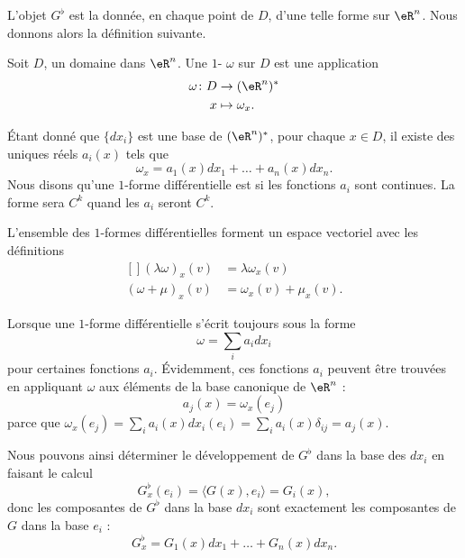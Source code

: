 L'objet $G^{\flat}$ est la donnée, en chaque point de $D$, d'une telle forme sur $\eR^n$. Nous donnons alors la définition suivante.
\begin{definition}
	Soit $D$, un domaine dans $\eR^n$. Une $1$- $\omega$ sur $D$ est une application
	\begin{equation}
		\begin{aligned}
				\omega\colon D&\to (\eR^n)^* \\
				x&\mapsto \omega_x. 
			\end{aligned}
		\end{equation}
\end{definition}
Étant donné que $\{ dx_i \}$ est une base de $(\eR^n)^*$, pour chaque $x\in D$, il existe des uniques réels $a_i(x)$ tels que
\begin{equation}
	\omega_x=a_1(x)dx_1+\ldots+a_n(x)dx_n.
\end{equation}
Nous disons qu'une $1$-forme différentielle est  si les fonctions $a_i$ sont continues. La forme sera $C^k$ quand les $a_i$ seront $C^k$.

\begin{remark}
	L'ensemble des $1$-formes différentielles forment un espace vectoriel avec les définitions
	\begin{equation}
		\begin{aligned}[]
			(\lambda\omega)_x(v)&=\lambda\omega_x(v)\\
			(\omega+\mu)_x(v)&=\omega_x(v)+\mu_x(v).
		\end{aligned}
	\end{equation}
\end{remark}

Lorsque une $1$-forme différentielle s'écrit toujours sous la forme
\begin{equation}
	\omega=\sum_i a_idx_i
\end{equation}
pour certaines fonctions $a_i$. Évidemment, ces fonctions $a_i$ peuvent être trouvées en appliquant $\omega$ aux éléments de la base canonique de $\eR^n$ :
\begin{equation}
	a_j(x)=\omega_x(e_j)
\end{equation}
parce que $\omega_x(e_j)=\sum_ia_i(x)dx_i(e_i)=\sum_ia_i(x)\delta_{ij}=a_j(x)$.

Nous pouvons ainsi déterminer le développement de $G^{\flat}$ dans la base des $dx_i$ en faisant le calcul
\begin{equation}
	G_x^{\flat}(e_i)=\langle G(x), e_i\rangle =G_i(x),
\end{equation}
donc les composantes de $G^{\flat}$ dans la base $dx_i$ sont exactement les composantes de $G$ dans la base $e_i$ :
\begin{equation}
	G^{\flat}_x=G_1(x)dx_1+\ldots+G_n(x)dx_n.
\end{equation}


